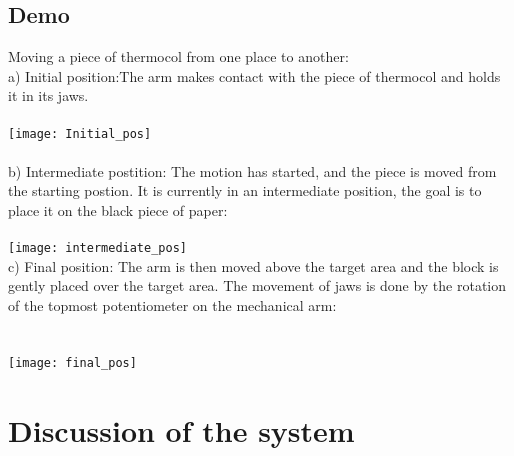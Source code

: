 \documentclass[a4wide]{article}
\begin{document}
\subsection{Demo}
Moving a piece of thermocol from one place to another:\\
a) Initial position:The arm makes contact with the piece of thermocol and holds it in its jaws.\\
\\
\hbox{}
\texttt{[image: Initial\_pos]}
\\
\\
b) Intermediate postition: The motion has started, and the piece is moved from the starting postion. It is currently in an intermediate position, the goal is to place it on the black piece of paper:\\
\\
\hbox{}
\texttt{[image: intermediate\_pos]}
\\
\newpage
c) Final position: The arm is then moved above the target area and the block is gently placed over the target area. The movement of jaws is done by the rotation of the topmost potentiometer on the mechanical arm: \\
\\
\hbox{}
\\
\texttt{[image: final\_pos]}

\newpage
\section{Discussion of the system}
\end{document}
